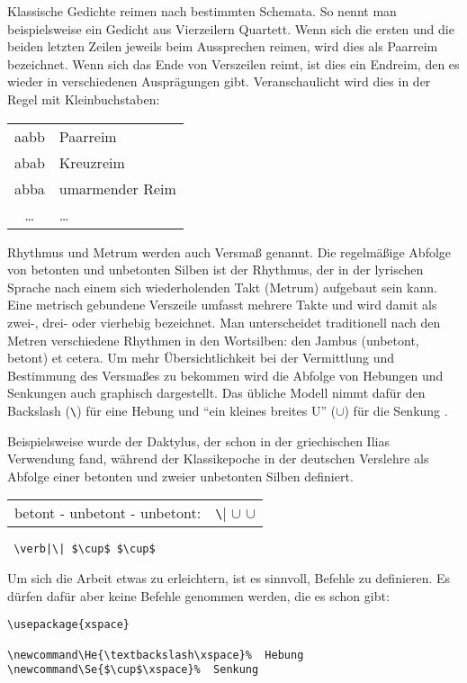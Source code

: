 Klassische Gedichte reimen nach bestimmten Schemata. So nennt man beispielsweise
ein Gedicht aus Vierzeilern Quartett. Wenn sich die ersten und die beiden letzten
Zeilen jeweils beim Aussprechen reimen, wird dies als Paarreim bezeichnet. 
Wenn sich das Ende von Verszeilen reimt, ist dies ein Endreim, den es wieder in
verschiedenen Ausprägungen gibt. Veranschaulicht wird dies in der Regel mit
Kleinbuchstaben:

\begin{tabular}{cl}
aabb & Paarreim \\
abab & Kreuzreim \\
abba & umarmender Reim \\
\ldots & \ldots \\
\end{tabular}

Rhythmus und Metrum werden auch Versmaß genannt. Die regelmäßige Abfolge von betonten
und unbetonten Silben ist der Rhythmus, der in der lyrischen Sprache nach einem sich 
wiederholenden Takt (Metrum) aufgebaut sein kann. Eine metrisch gebundene Verszeile 
umfasst mehrere Takte und wird damit als zwei-, drei- oder vierhebig bezeichnet. Man
unterscheidet traditionell nach den Metren verschiedene Rhythmen in den Wortsilben:
den Jambus (unbetont, betont) et cetera. Um mehr Übersichtlichkeit bei der Vermittlung und
Bestimmung des Versmaßes zu bekommen wird die Abfolge von Hebungen und Senkungen auch
graphisch dargestellt. Das übliche Modell nimmt dafür den Backslash (\verb|\|) für eine 
Hebung und "`ein kleines breites U"' ($\cup$) für die Senkung \cite[17]{Neuhaus}.

Beispielsweise wurde der Daktylus, der schon in der griechischen Ilias Verwendung fand,
während der Klassikepoche in der deutschen Verslehre als Abfolge einer 
betonten und zweier unbetonten Silben definiert.

\begin{tabular}{ll}
betont - unbetont - unbetont: &  \verb|\| $\cup$ $\cup$ \\
\end{tabular}

\begin{lstlisting}
 \verb|\| $\cup$ $\cup$ 
\end{lstlisting}

Um sich die Arbeit etwas zu erleichtern, ist es sinnvoll, Befehle zu definieren.
Es dürfen dafür aber keine Befehle genommen werden, die es schon gibt:
\begin{lstlisting}
\usepackage{xspace}

\newcommand\He{\textbackslash\xspace}%  Hebung
\newcommand\Se{$\cup$\xspace}%  Senkung 
\end{lstlisting}

